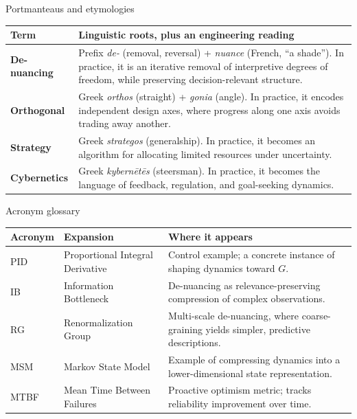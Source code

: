 \documentclass[presentation,aspectratio=169,11pt]{beamer}
\newcommand{\KeyTerm}[1]{\textbf{#1}}
\begin{document}
\begin{frame}{Portmanteaus and etymologies}
\justifying
\small
\begin{table}
\begin{tabularx}{\linewidth}{@{}l X@{}}
\toprule
\textbf{Term} & \textbf{Linguistic roots, plus an engineering reading}\\
\midrule
\KeyTerm{De-nuancing} & Prefix \emph{de-} (removal, reversal) + \emph{nuance} (French, ``a shade''). In practice, it is an iterative removal of interpretive degrees of freedom, while preserving decision-relevant structure.\\
\addlinespace
\KeyTerm{Orthogonal} & Greek \emph{orthos} (straight) + \emph{gonia} (angle). In practice, it encodes independent design axes, where progress along one axis avoids trading away another.\\
\addlinespace
\KeyTerm{Strategy} & Greek \emph{strategos} (generalship). In practice, it becomes an algorithm for allocating limited resources under uncertainty.\\
\addlinespace
\KeyTerm{Cybernetics} & Greek \emph{kybern\=et\=es} (steersman). In practice, it becomes the language of feedback, regulation, and goal-seeking dynamics.\\
\bottomrule
\end{tabularx}
\end{table}
\end{frame}

\begin{frame}{Acronym glossary}
\justifying
\scriptsize
\begin{table}
\begin{tabularx}{\linewidth}{@{}l l X@{}}
\toprule
\textbf{Acronym} & \textbf{Expansion} & \textbf{Where it appears}\\
\midrule
PID & Proportional Integral Derivative & Control example; a concrete instance of shaping dynamics toward $G$.\\
IB & Information Bottleneck & De-nuancing as relevance-preserving compression of complex observations.\\
RG & Renormalization Group & Multi-scale de-nuancing, where coarse-graining yields simpler, predictive descriptions.\\
MSM & Markov State Model & Example of compressing dynamics into a lower-dimensional state representation.\\
MTBF & Mean Time Between Failures & Proactive optimism metric; tracks reliability improvement over time.\\
\bottomrule
\end{tabularx}
\end{table}
\end{frame}
\end{document}
